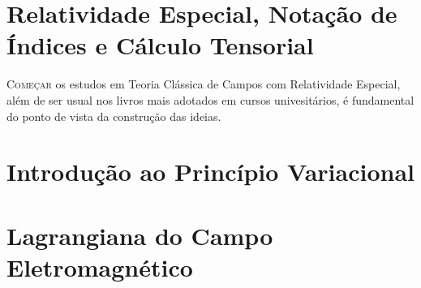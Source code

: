 \documentclass[12pt,a4paper]{article}
\begin{document}
\tableofcontents %
\newpage %

\section{Relatividade Especial, Notação de Índices e Cálculo Tensorial}

\lettrine[lines=3, nindent=0.1em]{\capitular{}C}{omeçar} os estudos
em Teoria Clássica de Campos com Relatividade Especial, além de ser usual nos livros mais adotados
em cursos univesitários, é fundamental do ponto de vista da construção das ideias.



\pagebreak
















\section{Introdução ao Princípio Variacional}

\section{Lagrangiana do Campo Eletromagnético}
\end{document}
